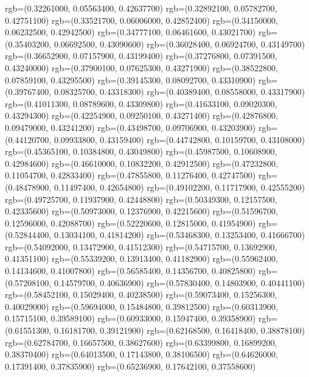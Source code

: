 {{        rgb=(0.32261000, 0.05563400, 0.42637700)
        rgb=(0.32892100, 0.05782700, 0.42751100)
        rgb=(0.33521700, 0.06006000, 0.42852400)
        rgb=(0.34150000, 0.06232500, 0.42942500)
        rgb=(0.34777100, 0.06461600, 0.43021700)
        rgb=(0.35403200, 0.06692500, 0.43090600)
        rgb=(0.36028400, 0.06924700, 0.43149700)
        rgb=(0.36652900, 0.07157900, 0.43199400)
        rgb=(0.37276800, 0.07391500, 0.43240000)
        rgb=(0.37900100, 0.07625300, 0.43271900)
        rgb=(0.38522800, 0.07859100, 0.43295500)
        rgb=(0.39145300, 0.08092700, 0.43310900)
        rgb=(0.39767400, 0.08325700, 0.43318300)
        rgb=(0.40389400, 0.08558000, 0.43317900)
        rgb=(0.41011300, 0.08789600, 0.43309800)
        rgb=(0.41633100, 0.09020300, 0.43294300)
        rgb=(0.42254900, 0.09250100, 0.43271400)
        rgb=(0.42876800, 0.09479000, 0.43241200)
        rgb=(0.43498700, 0.09706900, 0.43203900)
        rgb=(0.44120700, 0.09933800, 0.43159400)
        rgb=(0.44742800, 0.10159700, 0.43108000)
        rgb=(0.45365100, 0.10384800, 0.43049800)
        rgb=(0.45987500, 0.10608900, 0.42984600)
        rgb=(0.46610000, 0.10832200, 0.42912500)
        rgb=(0.47232800, 0.11054700, 0.42833400)
        rgb=(0.47855800, 0.11276400, 0.42747500)
        rgb=(0.48478900, 0.11497400, 0.42654800)
        rgb=(0.49102200, 0.11717900, 0.42555200)
        rgb=(0.49725700, 0.11937900, 0.42448800)
        rgb=(0.50349300, 0.12157500, 0.42335600)
        rgb=(0.50973000, 0.12376900, 0.42215600)
        rgb=(0.51596700, 0.12596000, 0.42088700)
        rgb=(0.52220600, 0.12815000, 0.41954900)
        rgb=(0.52844400, 0.13034100, 0.41814200)
        rgb=(0.53468300, 0.13253400, 0.41666700)
        rgb=(0.54092000, 0.13472900, 0.41512300)
        rgb=(0.54715700, 0.13692900, 0.41351100)
        rgb=(0.55339200, 0.13913400, 0.41182900)
        rgb=(0.55962400, 0.14134600, 0.41007800)
        rgb=(0.56585400, 0.14356700, 0.40825800)
        rgb=(0.57208100, 0.14579700, 0.40636900)
        rgb=(0.57830400, 0.14803900, 0.40441100)
        rgb=(0.58452100, 0.15029400, 0.40238500)
        rgb=(0.59073400, 0.15256300, 0.40029000)
        rgb=(0.59694000, 0.15484800, 0.39812500)
        rgb=(0.60313900, 0.15715100, 0.39589100)
        rgb=(0.60933000, 0.15947400, 0.39358900)
        rgb=(0.61551300, 0.16181700, 0.39121900)
        rgb=(0.62168500, 0.16418400, 0.38878100)
        rgb=(0.62784700, 0.16657500, 0.38627600)
        rgb=(0.63399800, 0.16899200, 0.38370400)
        rgb=(0.64013500, 0.17143800, 0.38106500)
        rgb=(0.64626000, 0.17391400, 0.37835900)
        rgb=(0.65236900, 0.17642100, 0.37558600)
}}
